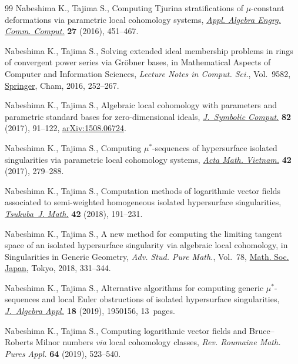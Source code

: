 \documentclass[10pt,a4paper]{amsart}
\numberwithin{equation}{section}
\begin{document}
\begin{thebibliography}{99}
Nabeshima K., Tajima S., Computing {T}jurina stratifications of
 {$\mu$}-constant deformations via parametric local cohomology systems,
 \href{https://doi.org/10.1007/s00200-016-0289-4}{\textit{Appl. Algebra Engrg. Comm. Comput.}} \textbf{27} (2016), 451--467.

Nabeshima K., Tajima S., Solving extended ideal membership problems in rings of
 convergent power series via {G}r\"obner bases, in Mathematical Aspects of
 Computer and Information Sciences, \textit{Lecture Notes in Comput. Sci.},
 Vol.~9582, \href{https://doi.org/10.1007/978-3-319-32859-1_22}{Springer}, Cham, 2016, 252--267.

Nabeshima K., Tajima S., Algebraic local cohomology with parameters and
 parametric standard bases for zero-dimensional ideals, \href{https://doi.org/10.1016/j.jsc.2017.01.003}{\textit{J.~Symbolic
 Comput.}} \textbf{82} (2017), 91--122, \href{https://arxiv.org/abs/1508.06724}{arXiv:1508.06724}.

Nabeshima K., Tajima S., Computing {$\mu^*$}-sequences of hypersurface isolated
 singularities via parametric local cohomology systems, \href{https://doi.org/10.1007/s40306-016-0198-4}{\textit{Acta Math.
 Vietnam.}} \textbf{42} (2017), 279--288.

Nabeshima K., Tajima S., Computation methods of logarithmic vector fields
 associated to semi-weighted homogeneous isolated hypersurface singularities,
 \href{https://doi.org/10.21099/tkbjm/1554170422}{\textit{Tsukuba~J. Math.}} \textbf{42} (2018), 191--231.

Nabeshima K., Tajima S., A new method for computing the limiting tangent space
 of an isolated hypersurface singularity via algebraic local cohomology, in
 Singularities in Generic Geometry, \textit{Adv. Stud. Pure Math.}, Vol.~78,
 \href{https://doi.org/10.2969/aspm/07810331}{Math. Soc. Japan}, Tokyo, 2018, 331--344.

Nabeshima K., Tajima S., Alternative algorithms for computing generic
 {$\mu^*$}-sequences and local {E}uler obstructions of isolated hypersurface
 singularities, \href{https://doi.org/10.1142/S0219498819501561}{\textit{J.~Algebra Appl.}} \textbf{18} (2019), 1950156,
 13~pages.

Nabeshima K., Tajima S., Computing logarithmic vector fields and
 {B}ruce--{R}oberts {M}ilnor numbers {\it via} local cohomology classes,
 \textit{Rev. Roumaine Math. Pures Appl.} \textbf{64} (2019), 523--540.


\end{thebibliography}
\end{document}
